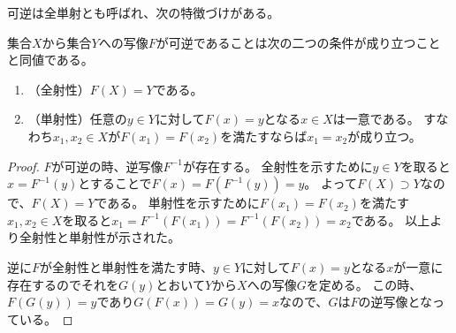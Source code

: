 可逆は全単射とも呼ばれ、次の特徴づけがある。

\begin{proposition}
集合$X$から集合$Y$への写像$F$が可逆であることは次の二つの条件が成り立つことと同値である。
\begin{enumerate}
\item
（全射性）$F(X) = Y$である。
\item
（単射性）任意の$y \in Y$に対して$F(x) = y$となる$x \in X$は一意である。
すなわち$x_1, x_2 \in X$が$F(x_1) = F(x_2)$を満たすならば$x_1 = x_2$が成り立つ。
\end{enumerate}
\end{proposition}

\begin{proof}
$F$が可逆の時、逆写像$F^{-1}$が存在する。
全射性を示すために$y \in Y$を取ると$x = F^{-1}(y)$とすることで$F(x) = F(F^{-1}(y)) = y$。
よって$F(X) \supset Y$なので、$F(X) = Y$である。
単射性を示すために$F(x_1) = F(x_2)$を満たす$x_1, x_2 \in X$を取ると$x_1 = F^{-1}(F(x_1)) = F^{-1}(F(x_2)) = x_2$である。
以上より全射性と単射性が示された。

逆に$F$が全射性と単射性を満たす時、$y \in Y$に対して$F(x) = y$となる$x$が一意に存在するのでそれを$G(y)$とおいて$Y$から$X$への写像$G$を定める。
この時、$F(G(y)) = y$であり$G(F(x)) = G(y) = x$なので、$G$は$F$の逆写像となっている。
\end{proof}
